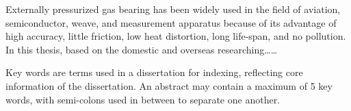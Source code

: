 \begin{eabstract}

  Externally pressurized gas bearing has been widely used in the field of aviation, semiconductor, weave, and measurement apparatus because of its advantage of high accuracy, little friction, low heat distortion, long life-span, and no pollution. In this thesis, based on the domestic and overseas researching\dots\dots

  Key words are terms used in a dissertation for indexing, reflecting core information of the dissertation. An abstract may contain a maximum of 5 key words, with semi-colons used in between to separate one another.

\end{eabstract}

